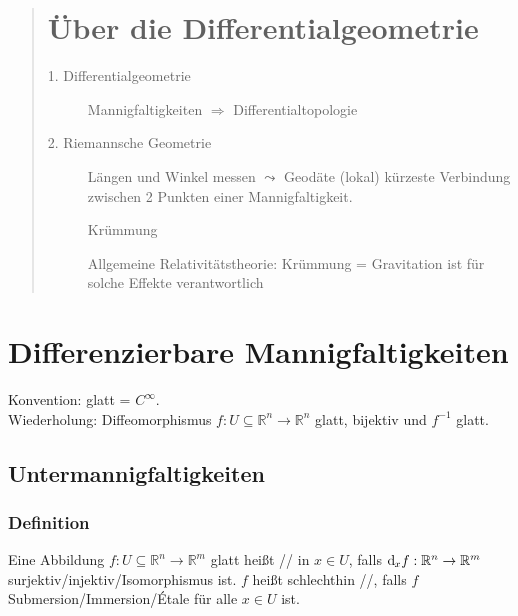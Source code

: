 
\newcommand{\fach}{Differentialgeometrie \RM{1}.}
\newcommand{\semester}{WiSe 2014}
\newcommand{\homepage}{https://wwwmath.uni-muenster.de/u/frederik.witt/diffgeoI.html}
\newcommand{\prof}{Frederik Witt}
\newcommand{\verfasser}{Arne Grauer}
\newcommand{\mail}{arne.grauer@uni-muenster.de}




\maketitle
\begin{abstract}

\section*{Über die Differentialgeometrie}
\begin{description}
	\item[1. Differentialgeometrie] Mannigfaltigkeiten $\Rightarrow $ Differentialtopologie
	\item[2. Riemannsche Geometrie] Längen und Winkel messen $\leadsto$ Geodäte (lokal) kürzeste Verbindung zwischen 2 Punkten einer Mannigfaltigkeit.
	
	Krümmung
	
	Allgemeine Relativitätstheorie: Krümmung = Gravitation ist für solche Effekte verantwortlich
\end{description}
\end{abstract}

\tableofcontents
\cleardoubleoddemptypage
{}
\setcounter{page}{1}


\section{Differenzierbare Mannigfaltigkeiten} %
\label{sec:1}
Konvention: glatt = $C^\infty$.\\
Wiederholung: Diffeomorphismus $f : U \subseteq \mathds{R}^n \to \mathds{R}^n$ glatt, bijektiv und $f ^{-1}$ glatt.

\subsection{Untermannigfaltigkeiten} %
\label{sub:11}

\subsubsection[Definition: Submersion, Immersion und Étale]{Definition} %
\label{ssub:11}
Eine Abbildung $f : U \subseteq \mathds{R}^n \to \mathds{R}^m$ glatt heißt // in $x \in U$, falls
$\mathrm{d}\mkern-1.0mu_x f : \mathbb{R}^n \to \mathbb{R}^m$ surjektiv/injektiv/Isomorphismus ist. 
$f$ heißt schlechthin //, falls $f$ Submersion/Immersion/Étale für alle $x \in U$ ist.

